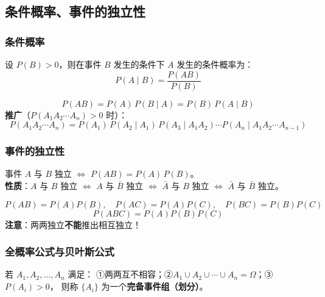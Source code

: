 \documentclass[12pt, a4paper]{article}
\begin{document}
\subsection{条件概率、事件的独立性}

\subsubsection{条件概率}

\begin{tcolorbox}[defbox, title={条件概率}]
    设 $P(B)>0$，则在事件 $B$ 发生的条件下 $A$ 发生的条件概率为：
    \[
        P(A\mid B) = \frac{P(AB)}{P(B)}
    \]
\end{tcolorbox}

\begin{tcolorbox}[thmbox, title={乘法公式（链式法则）}]
    \[
        P(AB) = P(A)\,P(B\mid A) = P(B)\,P(A\mid B)
    \]
    \textbf{推广}（$P(A_1A_2\cdots A_n)>0$ 时）：
    \[
        P(A_1A_2\cdots A_n)
        = P(A_1)\,P(A_2\mid A_1)\,P(A_3\mid A_1A_2)\cdots
        P(A_n\mid A_1A_2\cdots A_{n-1})
    \]
\end{tcolorbox}

\subsubsection{事件的独立性}

\begin{tcolorbox}[defbox, title={独立性定义}]
    事件 $A$ 与 $B$ 独立 $\iff$ $P(AB) = P(A)\,P(B)$。\\[4pt]
    \textbf{性质}：$A$ 与 $B$ 独立 $\iff$ $A$ 与 $\bar{B}$ 独立
    $\iff$ $\bar{A}$ 与 $B$ 独立 $\iff$ $\bar{A}$ 与 $\bar{B}$ 独立。
\end{tcolorbox}

\begin{tcolorbox}[thmbox, title={三个事件相互独立（需同时满足四个条件）}]
    \[
        P(AB)=P(A)P(B),\quad P(AC)=P(A)P(C),\quad P(BC)=P(B)P(C)
    \]
    \[
        P(ABC)=P(A)P(B)P(C)
    \]
    \textbf{注意}：两两独立\textbf{不能}推出相互独立！
\end{tcolorbox}

\subsubsection{全概率公式与贝叶斯公式}

\begin{tcolorbox}[defbox, title={完备事件组（划分）}]
    若 $A_1, A_2, \ldots, A_n$ 满足：
    ①两两互不相容；②$A_1\cup A_2\cup\cdots\cup A_n=\Omega$；③$P(A_i)>0$，
    则称 $\{A_i\}$ 为一个\textbf{完备事件组（划分）}。
\end{tcolorbox}
\end{document}
